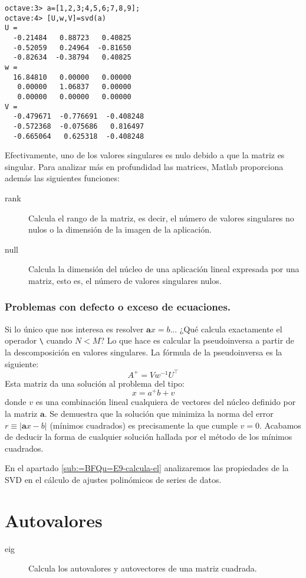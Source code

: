   \begin{verbatim}
octave:3> a=[1,2,3;4,5,6;7,8,9];
octave:4> [U,w,V]=svd(a)
U =
  -0.21484   0.88723   0.40825
  -0.52059   0.24964  -0.81650
  -0.82634  -0.38794   0.40825
w =
  16.84810   0.00000   0.00000
   0.00000   1.06837   0.00000
   0.00000   0.00000   0.00000
V =
  -0.479671  -0.776691  -0.408248
  -0.572368  -0.075686   0.816497
  -0.665064   0.625318  -0.408248
\end{verbatim}
Efectivamente, uno de los valores singulares es nulo debido a que la
matriz es singular. Para analizar más en profundidad las matrices,
Matlab proporciona además las siguientes funciones:

\begin{description}
\item [rank]Calcula el rango de la matriz, es decir, el
  número de valores singulares no nulos o la dimensión de la imagen de
  la aplicación.
\item [null]Calcula la dimensión del núcleo de una
  aplicación lineal expresada por una matriz, esto es, el número de
  valores singulares nulos.
\end{description}

\subsubsection{Problemas con defecto o exceso de ecuaciones.}

Si lo único que nos interesa es resolver $\mathbf{a}x=b$... ¿Qué
calcula exactamente el operador \texttt{\textbackslash{}} cuando $N<M$?
Lo que hace es calcular la pseudoinversa a partir de la descomposición
en valores singulares. La fórmula de la pseudoinversa es la siguiente:
$$A^{+}=Vw^{-1}U^{\top}$$
Esta matriz da una solución al problema del tipo:
$$x=a^{+}b+v$$
donde $v$ es una combinación lineal cualquiera de vectores del núcleo
definido por la matriz $\mathbf{a}$. Se demuestra que la solución
que minimiza la norma del error $r\equiv|\mathbf{a}x-b|$ (mínimos
cuadrados) es precisamente la que cumple $v=0$. Acabamos de deducir
la forma de cualquier solución hallada por el método de los mínimos
cuadrados.

En el apartado \ref{sub:=BFQu=E9-calcula-el} analizaremos las propiedades
de la SVD en el cálculo de ajustes polinómicos de series de datos.


\section{Autovalores}

\begin{description}
\item [eig]Calcula los autovalores y autovectores de una matriz
cuadrada.
\end{description}
